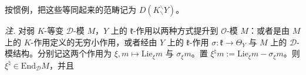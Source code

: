 按惯例，把这些等同起来的范畴记为 $D(K^{\backslash}_{\backslash}Y)$。

 \emph{注.} 对弱 $K$-等变 $\mathcal{D}$-模 $M$，$Y$ 上的 $\mathfrak{k}$-作用以两种方式提升到 $\mathcal{O}$-模 $M$：或者是由 $M$ 上的 $K$-作用定义的无穷小作用，或者经由 $Y$ 上的 $\mathfrak{k}$-作用 $\sigma:\mathfrak{k}\to\Theta_{Y}$ 与 $M$ 上的 $\mathcal{D}$-模结构。分别记这两个作用为 $\xi,m\mapsto\mathrm{Lie}_{\xi}m$ 与 $\sigma_{\xi}m$。置 $\xi^{\natural}m:=\mathrm{Lie}_{\xi}m-\sigma_{\xi}m$。则 $\xi^{\natural}\in\mathrm{End}_{\mathcal{D}}M$，并且

